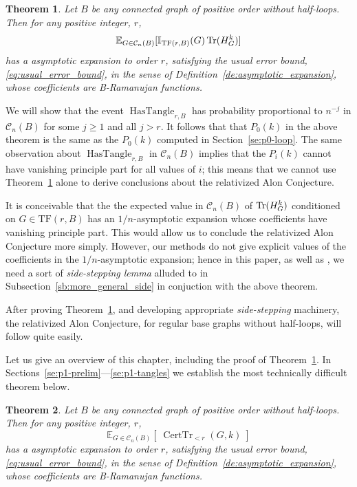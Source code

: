\documentclass{memo-l}
\theoremstyle{plain}
\newtheorem{theorem}{Theorem}[section]
\theoremstyle{definition}
\numberwithin{section}{chapter}
\numberwithin{equation}{chapter}
\newcommand{\trace}{{\rm Tr}}
\newcommand{\expect}[2]{{\mathbb{E}}_{#1}{\left[\; #2\; \right]}}
\DeclareMathOperator{\HasTangle}{HasTangle}
\newcommand{\tanglefree}{{\mathrm{TF}(r,B)}}
\DeclareMathOperator{\Tr}{Tr}
\DeclareMathOperator{\CertTr}{CertTr}
\theoremstyle{plain}
\newtheorem{thm}[theorem]{Theorem}
\theoremstyle{definition}
\newcommand\EE{\mathbb{E}}
\newcommand\II{\mathbb{I}}
\newcommand\cC{\mathcal{C}}
\begin{document}
\begin{thm} 
\label{th:main_expansion_B}
\label{TH:MAIN_EXPANSION_B}  %
Let $B$ be any connected graph of positive \gls{order} without
half-loops.  Then for any positive integer, $r$,
\begin{equation}\label{eq:rr'series} \EE_{G \in \cC_n(B)}[\II_{{\rm
TF}(r,B)}(G) \Tr(H_G^k) ] 
\end{equation}
has a \gls{asymptotic expansion} to order $r$,
satisfying the usual error bound,
\eqref{eq:usual_error_bound}, in the sense of
Definition~\ref{de:asymptotic_expansion}, 
whose \glspl{coefficient} are \glspl{B-Ramanujan function}.
\end{thm}

We will show that the event 
$\HasTangle_{r,B}$ has probability proportional to $n^{-j}$ in 
$\cC_n(B)$ for some
$j\ge 1$ and all $j> r$.  It follows that 
that $P_0(k)$ in the above theorem is the same as the
$P_0(k)$ computed in
Section~\ref{se:p0-loop}.
The same observation about $\HasTangle_{r,B}$ in $\cC_n(B)$
implies that
the $P_i(k)$ cannot have vanishing principle part for all values
of $i$;
this means that we cannot use Theorem~\ref{th:main_expansion_B}
alone to derive conclusions about the relativized Alon Conjecture.

It is conceivable that the the expected value in $\cC_n(B)$
of $\trace(H_G^k)$
conditioned on $G\in\tanglefree$ has an $1/n$-asymptotic expansion
whose coefficients have vanishing principle part. 
This would allow
us to conclude the relativized Alon Conjecture more simply.  However,
our methods do not give explicit values of the coefficients in the
$1/n$-asymptotic expansion; hence in this paper, as well as 
\cite{friedman_alon}, we need a sort of
{\em side-stepping lemma} alluded to in
Subsection~\ref{sb:more_general_side} in conjuction with the above
theorem.

After proving Theorem~\ref{th:main_expansion_B},
and developing appropriate {\em side-stepping} machinery,
the relativized Alon Conjecture, for regular base graphs without
half-loops, will follow quite easily.

Let us give an overview of this chapter, including 
the proof of Theorem~\ref{th:main_expansion_B}.
In Sections~\ref{se:p1-prelim}---\ref{se:p1-tangles} we establish the
most technically difficult theorem below.

\begin{theorem}\label{th:certified_trace_expansion}
\label{TH:CERTIFIED_TRACE_EXPANSION}  %
Let $B$ be any connected graph of positive \gls{order} without
half-loops.  Then for any positive integer, $r$,
\begin{equation}\label{eq:certified_expansion}
\expect{G \in \cC_n(B)}{\CertTr_{<r}(G,k)}
\end{equation}
has a \gls{asymptotic expansion} to order $r$,
satisfying the usual error bound,
\eqref{eq:usual_error_bound}, in the sense of
Definition~\ref{de:asymptotic_expansion}, 
whose \glspl{coefficient} are \glspl{B-Ramanujan function}.
\end{theorem}
\end{document}
